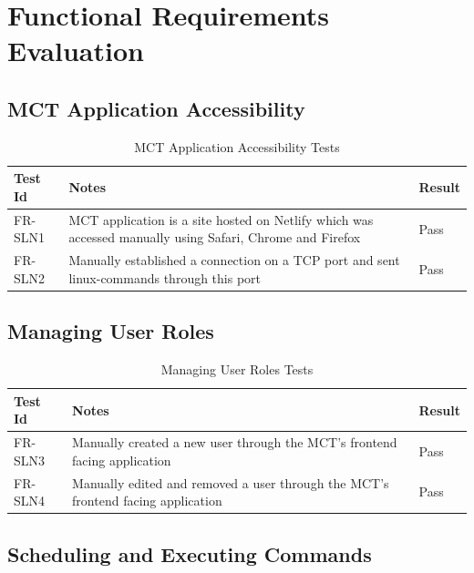 \documentclass[12pt, titlepage]{article}
\begin{document}
\listoftables %

\listoffigures %

\newpage


\section{Functional Requirements Evaluation}

\subsection{MCT Application Accessibility}

\begin{center}
\begin{longtable}{|p{2cm} | p{8cm} |p{2cm}| }
\caption{MCT Application Accessibility Tests}
\hline
\textbf{Test Id} & \textbf{Notes} & \textbf{Result} \\
\hline
FR-SLN1 & MCT application is a site hosted on Netlify which was accessed manually using Safari, Chrome and Firefox & Pass \\
\hline
FR-SLN2 & Manually established a connection on a TCP port and sent linux-commands through this port & Pass \\
\hline

\end{longtable}
\end{center}

\subsection{Managing User Roles}

\begin{center}
\begin{longtable}{|p{2cm} | p{8cm} |p{2cm}| }
\caption{Managing User Roles Tests}
\hline
\textbf{Test Id} & \textbf{Notes} & \textbf{Result} \\
\hline
FR-SLN3 & Manually created a new user through the MCT's frontend facing application & Pass \\
\hline
FR-SLN4 & Manually edited and removed a user through the MCT's frontend facing application & Pass \\
\hline

\end{longtable}
\end{center}

\subsection{Scheduling and Executing Commands}
\end{document}
